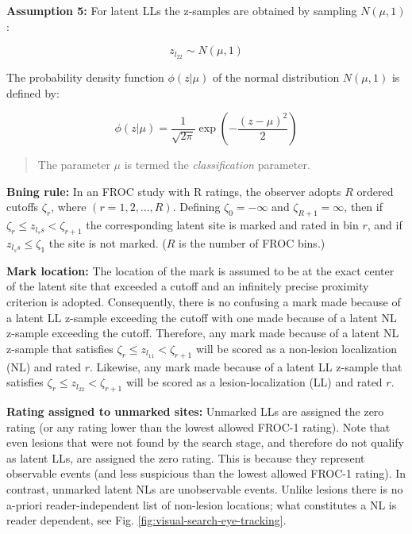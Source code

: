 \documentclass[
]{book}
\begin{document}
\textbf{Assumption 5:} For latent LLs the z-samples are obtained by sampling \(N \left ( \mu, 1 \right )\):

\begin{equation} 
z_{l_22} \sim N \left ( \mu, 1 \right )
\label{eq:rsm-sampling-l2}
\end{equation}

The probability density function \(\phi\left ( z | \mu \right )\) of the normal distribution \(N \left ( \mu, 1 \right )\) is defined by:

\begin{equation} 
\phi\left ( z | \mu \right )=\frac{1}{\sqrt{2\pi}}\exp\left ( -\frac{(z-\mu)^2}{2} \right )
\label{eq:rsm-pdf-phi-mu}
\end{equation}

\begin{quote}
The parameter \(\mu\) is termed the \emph{classification} parameter.
\end{quote}

\textbf{Bning rule:} In an FROC study with R ratings, the observer adopts \(R\) ordered cutoffs \(\zeta_r\), where \(\left ( r = 1, 2, ..., R \right )\). Defining \(\zeta_0 = -\infty\) and \(\zeta_{R+1} = \infty\), then if \(\zeta_r \leq z_{l_ss} < \zeta_{r+1}\) the corresponding latent site is marked and rated in bin \(r\), and if \(z_{l_ss} \leq \zeta_1\) the site is not marked. (\(R\) is the number of FROC bins.)

\textbf{Mark location:} The location of the mark is assumed to be at the exact center of the latent site that exceeded a cutoff and an infinitely precise proximity criterion is adopted. Consequently, there is no confusing a mark made because of a latent LL z-sample exceeding the cutoff with one made because of a latent NL z-sample exceeding the cutoff. Therefore, any mark made because of a latent NL z-sample that satisfies \(\zeta_r \leq z_{l_11} < \zeta_{r+1}\) will be scored as a non-lesion localization (NL) and rated \(r\). Likewise, any mark made because of a latent LL z-sample that satisfies \(\zeta_r \leq z_{l_22} < \zeta_{r+1}\) will be scored as a lesion-localization (LL) and rated \(r\).

\textbf{Rating assigned to unmarked sites:} Unmarked LLs are assigned the zero rating (or any rating lower than the lowest allowed FROC-1 rating). Note that even lesions that were not found by the search stage, and therefore do not qualify as latent LLs, are assigned the zero rating. This is because they represent observable events (and less suspicious than the lowest allowed FROC-1 rating). In contrast, unmarked latent NLs are unobservable events. Unlike lesions there is no a-priori reader-independent list of non-lesion locations; what constitutes a NL is reader dependent, see Fig. \ref{fig:visual-search-eye-tracking}.
\end{document}
